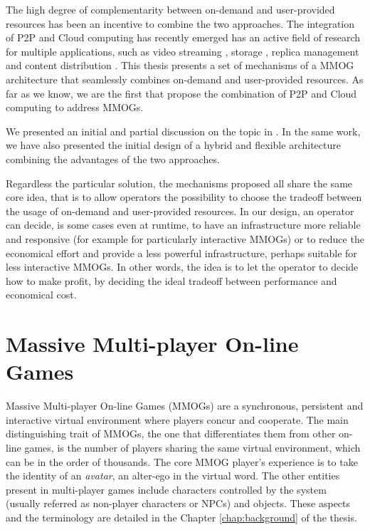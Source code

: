 \documentclass[final,10pt,a5paper]{phdimt}
\theoremstyle{definition}
\begin{document}
The high degree of complementarity between on-demand and user-provided resources has been an incentive to combine the two approaches.
The integration of P2P and Cloud computing has recently emerged has an active field of research for multiple applications, such as video streaming \cite{payberah2012clive}, storage \cite{xu2012integration}, replica management \cite{kavalionak2012p2p} and content distribution \cite{montresor2011cloudy}.
This thesis presents a set of mechanisms of a MMOG architecture that seamlessly combines on-demand and user-provided resources. As far as we know, we are the first that propose the combination of P2P and Cloud computing to address MMOGs.


We presented an initial and partial discussion on the topic in \cite{carlini2010integration,pos}. In the same work, we have also presented the initial design of a hybrid and flexible architecture combining the advantages of the two approaches. 

Regardless the particular solution, the mechanisms proposed all share the same core idea, that is to allow operators the possibility to choose the tradeoff between the usage of on-demand and user-provided resources.
In our design, an operator can decide, is some cases even at runtime, to have an infrastructure more reliable and responsive (for example for particularly interactive MMOGs) or to reduce the economical effort and provide a less powerful infrastructure, perhaps suitable for less interactive MMOGs. In other words, the idea is to let the operator to decide how to make profit, by deciding the ideal tradeoff between performance and economical cost.


\section{Massive Multi-player On-line Games}



Massive Multi-player On-line Games (MMOGs) are a synchronous, persistent and interactive virtual environment where players concur and cooperate.
The main distinguishing trait of MMOGs, the one that differentiates them from other on-line games, is the number of players sharing the same virtual environment, which can be in the order of thousands.
The core MMOG player's experience is to take the identity of an \textit{avatar}, an alter-ego in the virtual word. 
The other entities present in multi-player games include characters controlled by the system (usually referred as non-player characters or NPCs) and objects. These  aspects and the terminology are detailed in the Chapter \ref{chap:background} of the thesis.
\end{document}
